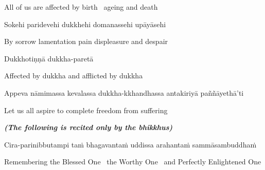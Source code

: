 \begin{english}
  All of us are affected by birth \breathmark\ ageing and death\hyperlink{endnote24-appendix}{\hypertarget{endnote24-body}{}}
\end{english}

Sokehi paridevehi dukkhehi domanassehi upāyāsehi

\begin{english}
  By sorrow lamentation pain displeasure\hyperlink{endnote25-appendix}{\hypertarget{endnote25-body}{}}
  and despair\hyperlink{endnote26-appendix}{\hypertarget{endnote26-body}{}}
\end{english}

Dukkhotiṇṇā dukkha-paretā

\begin{english}
  Affected by dukkha and afflicted by dukkha\hyperlink{endnote27-appendix}{\hypertarget{endnote27-body}{}}
\end{english}

\begin{pali-hang}
  Appeva nāmimassa kevalassa dukkha-kkhandhassa antakiriyā paññāyethā'ti
\end{pali-hang}

\begin{english}
  Let us all aspire to complete freedom from suffering
\end{english}

\clearpage

\begin{center}
  \textit{\textbf{(The following is recited only by the bhikkhus)}}
\end{center}

\begin{pali-hang}
  Cira-parinibbutampi taṁ bhagavantaṁ uddissa arahantaṁ sammāsambuddhaṁ
\end{pali-hang}

\begin{english-hang}
  Remembering the Blessed One \breathmark\ the Worthy One \breathmark\ and Perfectly Enlightened One\\
\end{english-hang}

